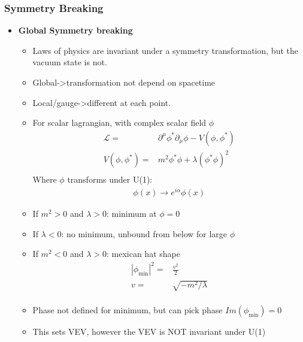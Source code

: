 \subsubsection{Symmetry Breaking}
\begin{itemize}
    \item \textbf{Global Symmetry breaking} \cite{wells}
    \begin{itemize}
        \item Laws of physics are invariant under a symmetry transformation, but the vacuum state is not. \cite{wells}
        \item Global->transformation not depend on spacetime \cite{wells}
        \item Local/gauge->different at each point. \cite{wells}
        \item For scalar lagrangian, with complex scalar field $\phi$ \cite{wells}
        \begin{equation}\begin{split}
        \mathcal{L}=&\partial^\mu\phi^*\partial_\mu\phi-V(\phi,\phi^*) \\
        V(\phi,\phi^*)=&m^2\phi^*\phi+\lambda(\phi^*\phi)^2 \\
        \end{split}\end{equation}
        Where $\phi$ transforms under U(1):
        \begin{equation}\begin{split}
        \phi(x)\to e^{i\alpha}\phi(x)
        \end{split}\end{equation}
        \item If $m^2>0$ and $\lambda>0$: minimum at $\phi=0$ \cite{wells}
        \item If $\lambda<0$: no minimum, unbound from below for large $\phi$ \cite{wells}
        \item If $m^2<0$ and $\lambda>0$: mexican hat shape \cite{wells}
        \begin{equation}\begin{split}
        |\phi_\text{min}|^2=&\frac{v^2}{2} \\
        v=&\sqrt{-m^2/\lambda} \\
        \end{split}\end{equation}
        \item Phase not defined for minimum, but can pick phase $Im(\phi_\text{min})=0$ \cite{wells}
        \item This sets VEV, however the VEV is NOT invariant under U(1) \cite{wells}

\end{itemize}
\end{itemize}
